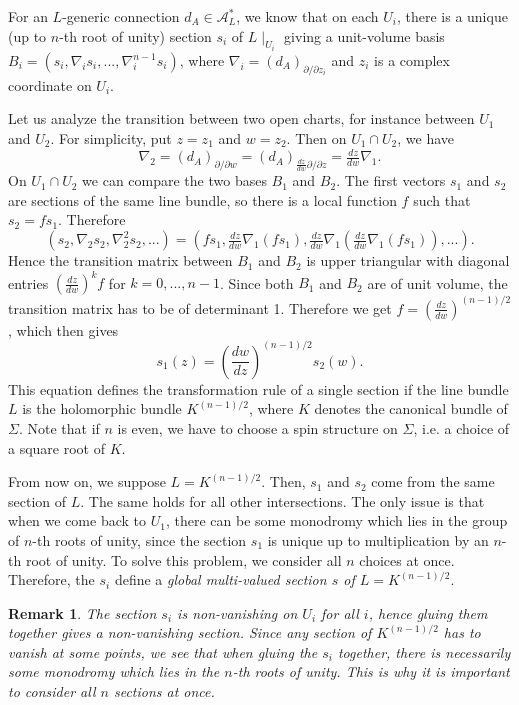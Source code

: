 \documentclass[11pt]{amsart}
\newtheorem{Remark}[thm]{Remark}
\numberwithin{thm}{section} %
\numberwithin{equation}{section} %
\numberwithin{figure}{section} %
\begin{document}
For an $L$-generic connection $d_A\in\mathcal{A}^*_L$, we know that on each $U_i$, there is a unique (up to $n$-th root of unity) section $s_i$ of $L\!\mid_{U_i}$ giving a unit-volume basis $B_i=(s_i,\nabla_i s_i, ..., \nabla_i^{n-1}s_i)$, where $\nabla_i=(d_A)_{\partial/\partial z_i}$ and $z_i$ is a complex coordinate on $U_i$.

Let us analyze the transition between two open charts, for instance between $U_1$ and $U_2$. For simplicity, put $z=z_1$ and $w=z_2$. Then on $U_1\cap U_2$, we have 
$$\nabla_2=(d_A)_{\partial/\partial w} = (d_A)_{\tfrac{dz}{dw}\partial/\partial z} = \tfrac{dz}{dw}\nabla_1.$$
On $U_1\cap U_2$ we can compare the two bases $B_1$ and $B_2$. The first vectors $s_1$ and $s_2$ are sections of the same line bundle, so there is a local function $f$ such that $s_2=fs_1$. Therefore
\begin{equation}\label{Eq:nature-L}
(s_2,\nabla_2 s_2,\nabla_2^2s_2,...)=(fs_1, \tfrac{dz}{dw}\nabla_1(fs_1), \tfrac{dz}{dw}\nabla_1\left(\tfrac{dz}{dw}\nabla_1(fs_1)\right),...).
\end{equation}
Hence the transition matrix between $B_1$ and $B_2$ is upper triangular with diagonal entries $\left(\tfrac{dz}{dw}\right)^kf$ for $k=0,...,n-1$. Since both $B_1$ and $B_2$ are of unit volume, the transition matrix has to be of determinant 1. Therefore we get $f=\left(\tfrac{dz}{dw}\right)^{(n-1)/2}$, which then gives
$$s_1(z)=\left(\frac{dw}{dz}\right)^{(n-1)/2}s_2(w).$$
This equation defines the transformation rule of a single section if the line bundle $L$ is the holomorphic bundle $K^{(n-1)/2}$, where $K$ denotes the canonical bundle of $\Sigma$. Note that if $n$ is even, we have to choose a spin structure on $\Sigma$, i.e. a choice of a square root of $K$.

From now on, we suppose $L=K^{(n-1)/2}$. Then, $s_1$ and $s_2$ come from the same section of $L$. The same holds for all other intersections. The only issue is that when we come back to $U_1$, there can be some monodromy which lies in the group of $n$-th roots of unity, since the section $s_1$ is unique up to multiplication by an $n$-th root of unity. To solve this problem, we consider all $n$ choices at once. Therefore, the $s_i$ define a \emph{global multi-valued section $s$ of $L=K^{(n-1)/2}$}.

\begin{Remark}
The section $s_i$ is non-vanishing on $U_i$ for all $i$, hence gluing them together gives a non-vanishing section. Since any section of $K^{(n-1)/2}$ has to vanish at some points, we see that when gluing the $s_i$ together, there is necessarily some monodromy which lies in the $n$-th roots of unity. This is why it is important to consider all $n$ sections at once.
\end{Remark}
\end{document}
